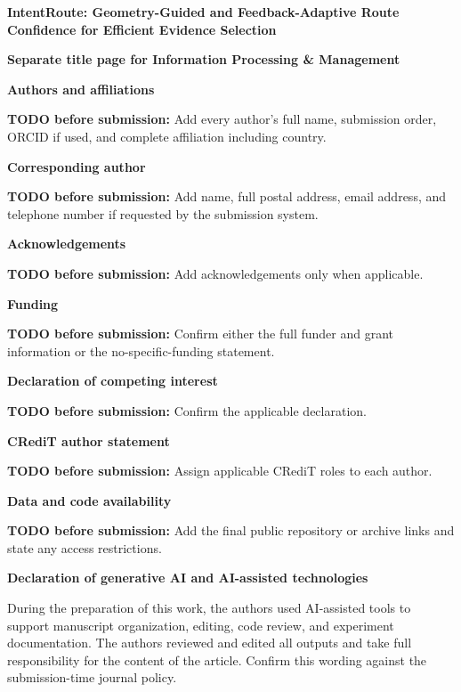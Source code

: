 \documentclass[10pt]{article}
\newcommand{\submissionfield}[1]{\vspace{0.45em}\noindent\textbf{#1}\par}
\begin{document}
\begin{center}
{\Large\bfseries IntentRoute: Geometry-Guided and Feedback-Adaptive Route Confidence for Efficient Evidence Selection\par}
\vspace{0.8em}
{\bfseries Separate title page for Information Processing \& Management\par}
\end{center}

\submissionfield{Authors and affiliations}
\textbf{TODO before submission:} Add every author's full name, submission
order, ORCID if used, and complete affiliation including country.

\submissionfield{Corresponding author}
\textbf{TODO before submission:} Add name, full postal address, email address,
and telephone number if requested by the submission system.

\submissionfield{Acknowledgements}
\textbf{TODO before submission:} Add acknowledgements only when applicable.

\submissionfield{Funding}
\textbf{TODO before submission:} Confirm either the full funder and grant
information or the no-specific-funding statement.

\submissionfield{Declaration of competing interest}
\textbf{TODO before submission:} Confirm the applicable declaration.

\submissionfield{CRediT author statement}
\textbf{TODO before submission:} Assign applicable CRediT roles to each author.

\submissionfield{Data and code availability}
\textbf{TODO before submission:} Add the final public repository or archive
links and state any access restrictions.

\submissionfield{Declaration of generative AI and AI-assisted technologies}
During the preparation of this work, the authors used AI-assisted tools to
support manuscript organization, editing, code review, and experiment
documentation. The authors reviewed and edited all outputs and take full
responsibility for the content of the article. Confirm this wording against the
submission-time journal policy.
\end{document}
